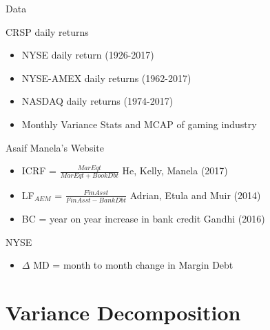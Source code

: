 \documentclass{beamer}
\begin{document}
\begin{frame}{Data}
	\begin{block}{CRSP daily returns}
		\begin{itemize}
			\item NYSE daily return (1926-2017)
			\item NYSE-AMEX daily returns (1962-2017)
			\item NASDAQ daily returns (1974-2017)
			\item Monthly Variance Stats and MCAP of gaming industry
		\end{itemize}
	\end{block}
	\begin{block}{Asaif Manela's Website}
		\begin{itemize}
			\item ICRF = $\frac{MarEqt}{MarEqt + BookDbt}$ He, Kelly, Manela (2017)
			\item LF$_{AEM}$ = $\frac{FinAsst}{FinAsst - BankDbt}$ Adrian, Etula and Muir (2014)
			\item BC = year on year increase in bank credit Gandhi (2016)
		\end{itemize}
	\end{block}
	\begin{block}{NYSE}
		\begin{itemize}
			\item $\Delta$ MD = month to month change in Margin Debt
		\end{itemize}
	\end{block}	
\end{frame}

\section{Variance Decomposition}

\end{document}
